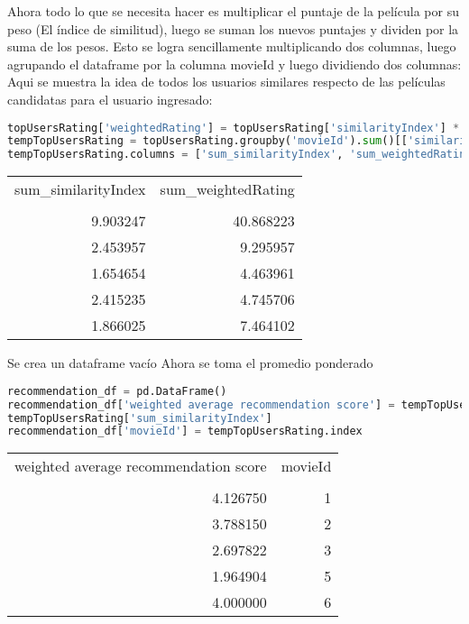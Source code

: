 \documentclass{uimppracticas}
\begin{document}
Ahora todo lo que se necesita hacer es multiplicar el puntaje de la película por su peso (El índice de similitud), luego se suman los nuevos puntajes y dividen por la suma de los pesos.
Esto se logra sencillamente multiplicando dos columnas, luego agrupando el dataframe por la columna movieId y luego dividiendo dos columnas:
Aqui se muestra la idea de todos los usuarios similares respecto de las películas candidatas para el usuario ingresado:

\begin{lstlisting}[language=python, basicstyle=\small]
topUsersRating['weightedRating'] = topUsersRating['similarityIndex'] * topUsersRating['rating']
tempTopUsersRating = topUsersRating.groupby('movieId').sum()[['similarityIndex', 'weightedRating']]
tempTopUsersRating.columns = ['sum_similarityIndex', 'sum_weightedRating']
\end{lstlisting}

\begin{tabular}{rr}
	\toprule
	sum\_similarityIndex &  sum\_weightedRating \\
	&                     \\
	\midrule
	9.903247 &           40.868223 \\
	2.453957 &            9.295957 \\
	1.654654 &            4.463961 \\
	2.415235 &            4.745706 \\
	1.866025 &            7.464102 \\
	\bottomrule
\end{tabular}

Se crea un dataframe vacío
Ahora se toma el promedio ponderado

\begin{lstlisting}[language=python, basicstyle=\small]
recommendation_df = pd.DataFrame()
recommendation_df['weighted average recommendation score'] = tempTopUsersRating['sum_weightedRating'] / \
tempTopUsersRating['sum_similarityIndex']
recommendation_df['movieId'] = tempTopUsersRating.index
\end{lstlisting}

\begin{tabular}{rr}
	\toprule
	weighted average recommendation score &  movieId \\
	&          \\
	\midrule
	4.126750 &        1 \\
	3.788150 &        2 \\
	2.697822 &        3 \\
	1.964904 &        5 \\
	4.000000 &        6 \\
	\bottomrule
\end{tabular}
\end{document}
